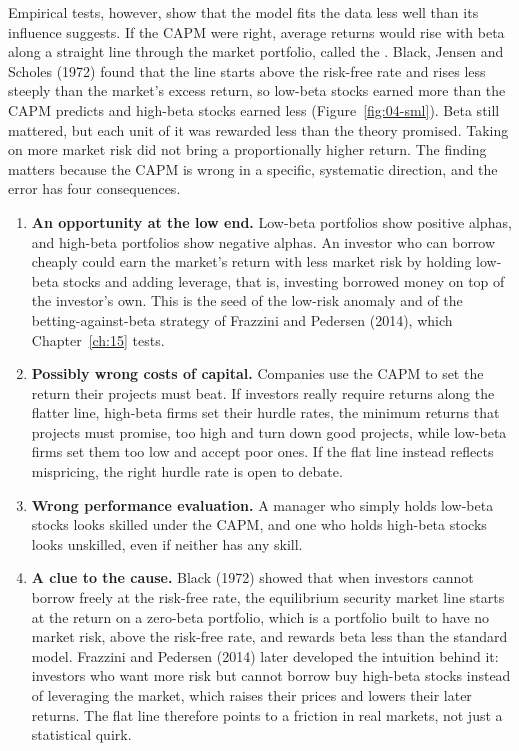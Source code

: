 Empirical tests, however, show that the model fits the data less well than its influence suggests. If the CAPM were right, average returns would rise with beta along a straight line through the market portfolio, called the . Black, Jensen and Scholes (1972) found that the line starts above the risk-free rate and rises less steeply than the market's excess return, so low-beta stocks earned more than the CAPM predicts and high-beta stocks earned less (Figure~\ref{fig:04-sml}). Beta still mattered, but each unit of it was rewarded less than the theory promised. Taking on more market risk did not bring a proportionally higher return. The finding matters because the CAPM is wrong in a specific, systematic direction, and the error has four consequences.

\begin{enumerate}
  \item \textbf{An opportunity at the low end.} Low-beta portfolios show positive alphas, and high-beta portfolios show negative alphas. An investor who can borrow cheaply could earn the market's return with less market risk by holding low-beta stocks and adding leverage, that is, investing borrowed money on top of the investor's own. This is the seed of the low-risk anomaly and of the betting-against-beta strategy of Frazzini and Pedersen (2014), which Chapter~\ref{ch:15} tests.
  \item \textbf{Possibly wrong costs of capital.} Companies use the CAPM to set the return their projects must beat. If investors really require returns along the flatter line, high-beta firms set their hurdle rates, the minimum returns that projects must promise, too high and turn down good projects, while low-beta firms set them too low and accept poor ones. If the flat line instead reflects mispricing, the right hurdle rate is open to debate.
  \item \textbf{Wrong performance evaluation.} A manager who simply holds low-beta stocks looks skilled under the CAPM, and one who holds high-beta stocks looks unskilled, even if neither has any skill.
  \item \textbf{A clue to the cause.} Black (1972) showed that when investors cannot borrow freely at the risk-free rate, the equilibrium security market line starts at the return on a zero-beta portfolio, which is a portfolio built to have no market risk, above the risk-free rate, and rewards beta less than the standard model. Frazzini and Pedersen (2014) later developed the intuition behind it: investors who want more risk but cannot borrow buy high-beta stocks instead of leveraging the market, which raises their prices and lowers their later returns. The flat line therefore points to a friction in real markets, not just a statistical quirk.
\end{enumerate}

